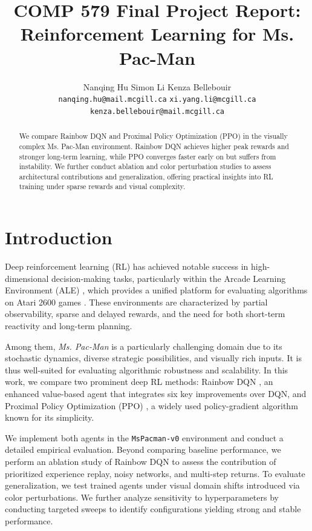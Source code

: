 \documentclass{article}
\title{COMP 579 Final Project Report: Reinforcement Learning for Ms. Pac-Man}
\author{
    Nanqing Hu\quad
    Simon Li\quad
    Kenza Bellebouir \\
    \texttt{nanqing.hu@mail.mcgill.ca} \quad
    \texttt{xi.yang.li@mcgill.ca} \quad
    \texttt{kenza.bellebouir@mail.mcgill.ca}
}
\begin{document}
\maketitle

\begin{abstract}
  We compare Rainbow DQN and Proximal Policy Optimization (PPO) in the visually complex Ms. Pac-Man environment. Rainbow DQN achieves higher peak rewards and stronger long-term learning, while PPO converges faster early on but suffers from instability. We further conduct ablation and color perturbation studies to assess architectural contributions and generalization, offering practical insights into RL training under sparse rewards and visual complexity.
\end{abstract}

\section{Introduction}

Deep reinforcement learning (RL) has achieved notable success in high-dimensional decision-making tasks, particularly within the Arcade Learning Environment (ALE) \cite{ale}, which provides a unified platform for evaluating algorithms on Atari 2600 games \cite{mnih2015human}. These environments are characterized by partial observability, sparse and delayed rewards, and the need for both short-term reactivity and long-term planning.

Among them, \textit{Ms. Pac-Man} is a particularly challenging domain due to its stochastic dynamics, diverse strategic possibilities, and visually rich inputs. It is thus well-suited for evaluating algorithmic robustness and scalability. In this work, we compare two prominent deep RL methods: Rainbow DQN \cite{hessel2018rainbow}, an enhanced value-based agent that integrates six key improvements over DQN, and Proximal Policy Optimization (PPO) \cite{schulman2017proximal}, a widely used policy-gradient algorithm known for its simplicity.

We implement both agents in the \texttt{MsPacman-v0} environment and conduct a detailed empirical evaluation. Beyond comparing baseline performance, we perform an ablation study of Rainbow DQN to assess the contribution of prioritized experience replay, noisy networks, and multi-step returns. To evaluate generalization, we test trained agents under visual domain shifts introduced via color perturbations. We further analyze sensitivity to hyperparameters by conducting targeted sweeps to identify configurations yielding strong and stable performance.
\end{document}
